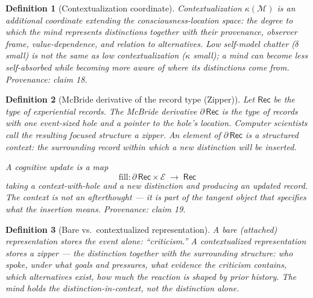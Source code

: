 \documentclass[11pt]{article}
\newtheorem{definition}{Definition}
\begin{document}
\begin{definition}[Contextualization coordinate]
\label{def:context}
\emph{Contextualization} $\kappa(\mathcal{M})$ is an additional coordinate extending the consciousness-location space: the degree to which the mind represents distinctions together with their provenance, observer frame, value-dependence, and relation to alternatives. Low self-model chatter ($\delta$ small) is not the same as low contextualization ($\kappa$ small); a mind can become less self-absorbed while becoming more aware of where its distinctions come from.
\emph{Provenance: claim 18.}
\end{definition}

\begin{definition}[McBride derivative of the record type (Zipper)]
\label{def:mcbride}
Let $\mathsf{Rec}$ be the type of experiential records. The \emph{McBride derivative} $\partial\,\mathsf{Rec}$ is the type of records with one event-sized hole and a pointer to the hole's location. Computer scientists call the resulting focused structure a \emph{zipper}. An element of $\partial\,\mathsf{Rec}$ is a structured context: the surrounding record within which a new distinction will be inserted.

A \emph{cognitive update} is a map
\[
  \mathrm{fill}\colon \partial\,\mathsf{Rec} \times \mathcal{E} \;\to\; \mathsf{Rec}
\]
taking a context-with-hole and a new distinction and producing an updated record. The context is not an afterthought --- it is part of the tangent object that specifies what the insertion means.
\emph{Provenance: claim 19.}
\end{definition}

\begin{definition}[Bare vs.\ contextualized representation]
A \emph{bare (attached)} representation stores the event alone: ``criticism.'' A \emph{contextualized} representation stores a zipper --- the distinction together with the surrounding structure: who spoke, under what goals and pressures, what evidence the criticism contains, which alternatives exist, how much the reaction is shaped by prior history. The mind holds the distinction-in-context, not the distinction alone.
\end{definition}
\end{document}
